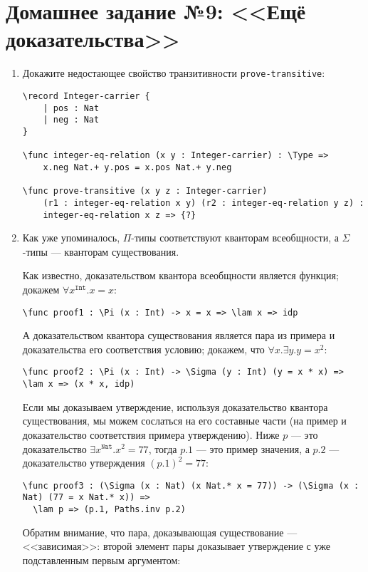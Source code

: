 \documentclass[10pt,a4paper,oneside]{article}
\begin{document}
\section*{Домашнее задание №9: <<Ещё доказательства>>}
\begin{enumerate}
\item Докажите недостающее свойство транзитивности \verb!prove-transitive!:

\begin{verbatim}
\record Integer-carrier {
    | pos : Nat
    | neg : Nat
}

\func integer-eq-relation (x y : Integer-carrier) : \Type =>
    x.neg Nat.+ y.pos = x.pos Nat.+ y.neg

\func prove-transitive (x y z : Integer-carrier) 
    (r1 : integer-eq-relation x y) (r2 : integer-eq-relation y z) :
    integer-eq-relation x z => {?}
\end{verbatim}

\item Как уже упоминалось, $\Pi$-типы соответствуют кванторам всеобщности,
а $\Sigma$-типы --- кванторам существования.

Как известно, доказательством квантора всеобщности является функция; докажем
$\forall x^\texttt{Int}.x=x$:

\verb!\func proof1 : \Pi (x : Int) -> x = x => \lam x => idp!

А доказательством квантора существования является пара из примера и доказательства
его соответствия условию; докажем, что
$\forall x.\exists y.y = x^2$:

\verb!\func proof2 : \Pi (x : Int) -> \Sigma (y : Int) (y = x * x) => \lam x => (x * x, idp)! 

Если мы доказываем утверждение, используя доказательство квантора существования,
мы можем сослаться на его составные части (на пример и доказательство соответствия примера утверждению).
Ниже $p$ --- это доказательство $\exists x^\texttt{Nat}.x^2=77$, тогда 
$p.1$ --- это пример значения, а $p.2$ --- доказательство утверждения
$(p.1)^2 = 77$:

\begin{verbatim}
\func proof3 : (\Sigma (x : Nat) (x Nat.* x = 77)) -> (\Sigma (x : Nat) (77 = x Nat.* x)) =>
  \lam p => (p.1, Paths.inv p.2)
\end{verbatim}

Обратим внимание, что пара, доказывающая существование --- <<зависимая>>: второй элемент пары 
доказывает утверждение с уже подставленным первым аргументом:


\end{enumerate}
\end{document}
